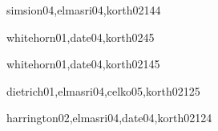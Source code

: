 \begin{syllabus}
\begin{unit}{\IMDataModelingDef}{simsion04,elmasri04,korth02}{14}{4}
    \IMDataModelingAllTopics
    \IMDataModelingAllObjectives
\end{unit}

\begin{unit}{\IMIndexingDef}{whitehorn01,date04,korth02}{4}{5}
    \IMIndexingAllTopics
    \IMIndexingAllObjectives
\end{unit}

\begin{unit}{\IMRelationalDatabasesDef}{whitehorn01,date04,korth02}{14}{5}
    \IMRelationalDatabasesAllTopics
    \IMRelationalDatabasesAllObjectives
\end{unit}

\begin{unit}{\IMQueryLanguagesDef}{dietrich01,elmasri04,celko05,korth02}{12}{5}
    \IMQueryLanguagesAllTopics
    \IMQueryLanguagesAllObjectives
\end{unit}

\begin{unit}{\IMRelationalDatabasesDesignDef}{harrington02,elmasri04,date04,korth02}{12}{4}
    \IMRelationalDatabasesDesignAllTopics
    \IMRelationalDatabasesDesignAllObjectives
\end{unit}




\begin{coursebibliography}
\end{coursebibliography}

\end{syllabus}

%
